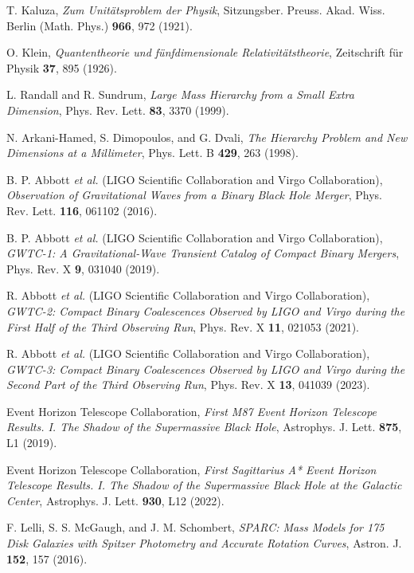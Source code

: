\documentclass[aps,prl,twocolumn,showpacs,superscriptaddress,groupedaddress]{revtex4-1}
\begin{document}
\begin{thebibliography}{50}

T. Kaluza,
\textit{Zum Unitätsproblem der Physik},
Sitzungsber. Preuss. Akad. Wiss. Berlin (Math. Phys.) \textbf{966}, 972 (1921).

O. Klein,
\textit{Quantentheorie und fünfdimensionale Relativitätstheorie},
Zeitschrift für Physik \textbf{37}, 895 (1926).

L. Randall and R. Sundrum,
\textit{Large Mass Hierarchy from a Small Extra Dimension},
Phys. Rev. Lett. \textbf{83}, 3370 (1999).

N. Arkani-Hamed, S. Dimopoulos, and G. Dvali,
\textit{The Hierarchy Problem and New Dimensions at a Millimeter},
Phys. Lett. B \textbf{429}, 263 (1998).

B. P. Abbott \textit{et al.} (LIGO Scientific Collaboration and Virgo Collaboration),
\textit{Observation of Gravitational Waves from a Binary Black Hole Merger},
Phys. Rev. Lett. \textbf{116}, 061102 (2016).

B. P. Abbott \textit{et al.} (LIGO Scientific Collaboration and Virgo Collaboration),
\textit{GWTC-1: A Gravitational-Wave Transient Catalog of Compact Binary Mergers},
Phys. Rev. X \textbf{9}, 031040 (2019).

R. Abbott \textit{et al.} (LIGO Scientific Collaboration and Virgo Collaboration),
\textit{GWTC-2: Compact Binary Coalescences Observed by LIGO and Virgo during the First Half of the Third Observing Run},
Phys. Rev. X \textbf{11}, 021053 (2021).

R. Abbott \textit{et al.} (LIGO Scientific Collaboration and Virgo Collaboration),
\textit{GWTC-3: Compact Binary Coalescences Observed by LIGO and Virgo during the Second Part of the Third Observing Run},
Phys. Rev. X \textbf{13}, 041039 (2023).

Event Horizon Telescope Collaboration,
\textit{First M87 Event Horizon Telescope Results. I. The Shadow of the Supermassive Black Hole},
Astrophys. J. Lett. \textbf{875}, L1 (2019).

Event Horizon Telescope Collaboration,
\textit{First Sagittarius A* Event Horizon Telescope Results. I. The Shadow of the Supermassive Black Hole at the Galactic Center},
Astrophys. J. Lett. \textbf{930}, L12 (2022).

F. Lelli, S. S. McGaugh, and J. M. Schombert,
\textit{SPARC: Mass Models for 175 Disk Galaxies with Spitzer Photometry and Accurate Rotation Curves},
Astron. J. \textbf{152}, 157 (2016).


\end{thebibliography}
\end{document}
